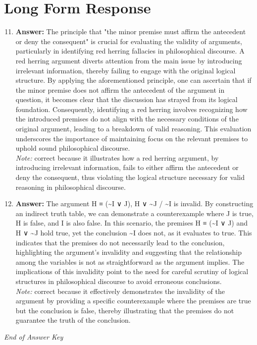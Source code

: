 \documentclass[12pt]{article}
\begin{document}
\section*{Long Form Response}
\begin{enumerate}[label=\arabic*.]
\setcounter{enumi}{10}
\item \textbf{Answer:} The principle that "the minor premise must affirm the antecedent or deny the consequent" is crucial for evaluating the validity of arguments, particularly in identifying red herring fallacies in philosophical discourse. A red herring argument diverts attention from the main issue by introducing irrelevant information, thereby failing to engage with the original logical structure. By applying the aforementioned principle, one can ascertain that if the minor premise does not affirm the antecedent of the argument in question, it becomes clear that the discussion has strayed from its logical foundation. Consequently, identifying a red herring involves recognizing how the introduced premises do not align with the necessary conditions of the original argument, leading to a breakdown of valid reasoning. This evaluation underscores the importance of maintaining focus on the relevant premises to uphold sound philosophical discourse.
\\ \textit{Note:} correct because it illustrates how a red herring argument, by introducing irrelevant information, fails to either affirm the antecedent or deny the consequent, thus violating the logical structure necessary for valid reasoning in philosophical discourse.
\item \textbf{Answer:} The argument H ≡ (\textasciitilde{}I ∨ J), H ∨ \textasciitilde{}J / \textasciitilde{}I is invalid. By constructing an indirect truth table, we can demonstrate a counterexample where J is true, H is false, and I is also false. In this scenario, the premises H ≡ (\textasciitilde{}I ∨ J) and H ∨ \textasciitilde{}J hold true, yet the conclusion \textasciitilde{}I does not, as it evaluates to true. This indicates that the premises do not necessarily lead to the conclusion, highlighting the argument's invalidity and suggesting that the relationship among the variables is not as straightforward as the argument implies. The implications of this invalidity point to the need for careful scrutiny of logical structures in philosophical discourse to avoid erroneous conclusions.
\\ \textit{Note:} correct because it effectively demonstrates the invalidity of the argument by providing a specific counterexample where the premises are true but the conclusion is false, thereby illustrating that the premises do not guarantee the truth of the conclusion.
\end{enumerate}

\vfill
\noindent\textit{End of Answer Key}
\end{document}

